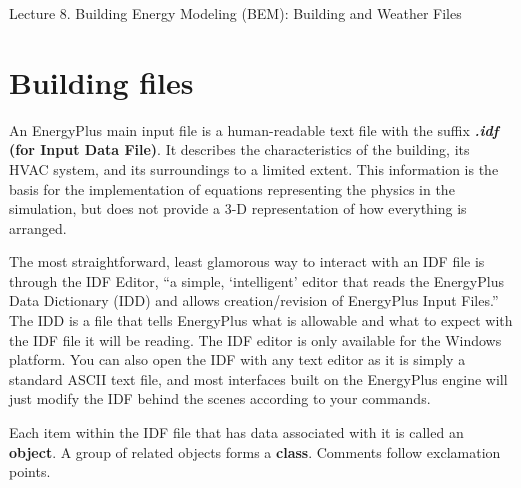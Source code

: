 \documentclass[10pt]{article}
\begin{document}
   \noindent
   \begin{center}

   \hrulefill
   
   \vspace{5pt}
   
   \vspace{0pt}
   
   {\Large \hfill  Lecture 8. Building Energy Modeling (BEM): Building and Weather Files}
   \vspace{5pt}
   
  
   \hrulefill
   \end{center}


{}

\section{Building files}

An EnergyPlus main input file is a human-readable text file with the suffix \textbf{\textit{.idf} (for Input Data File)}. It describes the characteristics of the building, its HVAC system, and its surroundings to a limited extent. This information is the basis for the implementation of equations representing the physics in the simulation, but does not provide a 3-D representation of how everything is arranged. 

The most straightforward, least glamorous way to interact with an IDF file is through the IDF Editor, ``a simple, `intelligent' editor that reads the EnergyPlus Data Dictionary (IDD) and allows creation/revision of EnergyPlus Input Files.'' \cite{EP9docs} The IDD is a file that tells EnergyPlus what is allowable and what to expect with the IDF file it will be reading. The IDF editor is only available for the Windows platform. You can also open the IDF with any text editor as it is simply a standard ASCII text file, and most interfaces built on the EnergyPlus engine will just modify the IDF behind the scenes according to your commands.

Each item within the IDF file that has data associated with it is called an \textbf{object}.  A group of related objects forms a \textbf{class}. Comments follow exclamation points. 
\end{document}
